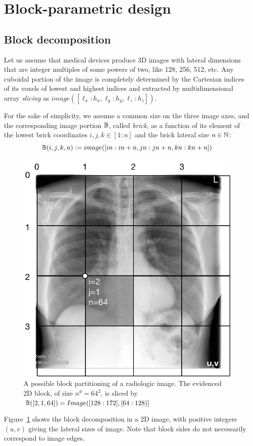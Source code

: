 
\section{Block-parametric design}\label{sec:filter}

\subsection{Block decomposition}\label{sec:block-decomposition}

Let us assume that medical devices produce 3D images with lateral dimensions that are integer multiples of some powers of two, like 128, 256, 512, etc.
Any cuboidal portion of the image is completely determined by the Cartesian indices of its voxels of lowest and highest indices and extracted by multidimensional array \emph{slicing} as $image([\ell_x : h_x, \ell_y : h_y, \ell_z : h_z])$.

For the sake of simplicity, we assume a common size on the three image axes, and the corresponding image portion $\mathbb{B}$, called \emph{brick}, as a function of its element of the  lowest  brick coordinates $i,j,k\in [1:n]$ and the brick lateral size $n\in\mathbb{N}$:
\[
\mathbb{B}(i,j,k,n) := image([in:in+n, jn:jn+n, kn:kn+n]) 
\]

\begin{figure}[htbp] %
   \centering
   \includegraphics[width=0.5\linewidth]{figs/blocks} 
   \caption{A possible block partitioning of a radiologic image. The evidenced 2D block, of size $n^d=64^2$, is sliced by $\mathbb{B}([2,1,64]) = Image([128:172],[64:128)]$}
   \label{fig:blocks}
\end{figure}


Figure~\ref{fig:blocks} shows the block decomposition in a 2D image, with positive integers $(u,v)$ giving the lateral sizes of image. Note that block sides do not necessarily correspond to image edges. 


